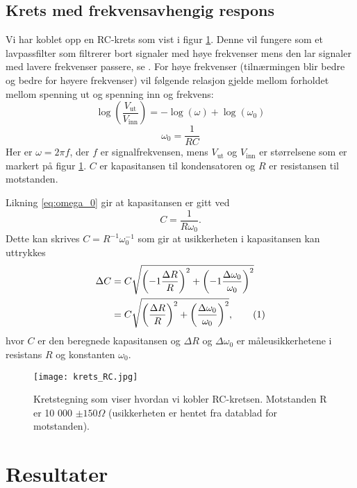 \documentclass[reprint, english,notitlepage]{revtex4-1}  %
\newcommand\numberthis{\addtocounter{equation}{1}\tag{\theequation}}
\begin{document}
\subsection{Krets med frekvensavhengig respons}
Vi har koblet opp en RC-krets som vist i figur \ref{fig:krets_RC}. Denne vil fungere som et lavpassfilter som filtrerer bort signaler med høye frekvenser mens den lar signaler med lavere frekvenser passere, se \citep{oppgave}. For høye frekvenser (tilnærmingen blir bedre og bedre for høyere frekvenser) vil følgende relasjon gjelde mellom forholdet mellom spenning ut og spenning inn og frekvens:
\begin{equation}
  \log \left( \frac{V_{\text{ut}}}{V_{\text{inn}}} \right) = -\log (\omega) + \log (\omega_0) \label{eq:lavpass}
\end{equation}
\begin{equation}
  \omega_0 = \frac{1}{RC} \label{eq:omega_0}
\end{equation}
Her er $\omega = 2 \pi f$, der $f$ er signalfrekvensen, mens $V_{\text{ut}}$ og $V_{\text{inn}}$ er størrelsene som er markert på figur \ref{fig:krets_RC}. $C$ er kapasitansen til kondensatoren og $R$ er resistansen til motstanden.

Likning \ref{eq:omega_0} gir at kapasitansen er gitt ved
\begin{equation}
  \label{eq:kapasitans}
  C = \frac{1}{R \omega_0}.
\end{equation}
Dette kan skrives $C = R^{-1} \omega_0^{-1}$ som gir at usikkerheten i kapasitansen kan uttrykkes
\begin{align*}
  \Delta C &= C \sqrt{\left( -1 \frac{\Delta R}{R} \right) ^2 + \left( -1 \frac{\Delta \omega_0}{\omega_0} \right) ^2} \\
  &= C \sqrt{\left( \frac{\Delta R}{R} \right) ^2 + \left( \frac{\Delta \omega_0}{\omega_0} \right) ^2}, \numberthis \label{eq:usikkerhet_C}
\end{align*}
hvor $C$ er den beregnede kapasitansen og $\Delta R$ og $\Delta \omega_0$ er måleusikkerhetene i resistans $R$ og konstanten $\omega_0$.

\begin{figure}
  \texttt{[image: krets\_RC.jpg]}
  \caption{Kretstegning som viser hvordan vi kobler RC-kretsen. Motstanden R er 10 000 $\pm 150 \Omega$ (usikkerheten er hentet fra datablad for motstanden).}
  \label{fig:krets_RC}
\end{figure}



\section{Resultater}
\end{document}
